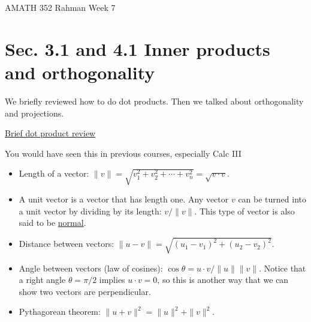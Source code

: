 \documentclass[reqno]{amsart}
\theoremstyle{definition}
\begin{document}
\begin{flushleft}
{\sc \Large AMATH 352 Rahman} \hfill Week 7
\bigskip
\end{flushleft}

\newcommand{\R}{\mathbb{R}}
\newcommand{\N}{\mathbb{N}}
\newcommand{\Z}{\mathbb{Z}}
\newcommand{\Q}{\mathbb{Q}}
\renewcommand{\CancelColor}{\color{red}}
\newcommand{\?}{\stackrel{?}{=}}
\renewcommand{\varphi}{\phi}
\newcommand{\card}{\text{Card}}
\newcommand{\bigzero}{\text{\Huge 0}}
\newcommand{\curvearrowdown}{{\color{red}\rotatebox{90}{$\curvearrowleft$}}}
\newcommand{\curvearrowup}{{\color{red}\rotatebox{90}{$\curvearrowright$}}}

\newcommand*\circled[1]{\color{red}\tikz[baseline=(char.base)]{
            \node[shape=circle,draw,inner sep=2pt] (char) {#1};}}



\section*{Sec. 3.1 and 4.1 Inner products and orthogonality}

We briefly reviewed how to do dot products.  Then we talked about orthogonality and projections.

\bigskip

\underline{Brief dot product review}

{\color{red}You would have seen this in previous courses, especially Calc III}

\begin{itemize}

\item  Length of a vector: $\|v\| = \sqrt{v_1^2 + v_2^2 + \cdots + v_n^2} = \sqrt{v\cdot v}$.
\item  A unit vector is a vector that has length one.  Any vector $v$ can be turned into a unit vector by dividing by its length: $v/\|v\|$.  This type of vector is also said to be \underline{normal}.
\item  Distance between vectors: $\|u-v\| = \sqrt{(u_1-v_1)^2 + (u_2-v_2)^2}$.
\item  Angle between vectors (law of cosines): $\cos\theta = u\cdot v/\|u\|\|v\|$.  Notice that a right angle $\theta = \pi/2$ implies $u\cdot v = 0$, so this is another way that we can show two vectors are perpendicular.
\item  Pythagorean theorem:  $\|u+v\|^2 = \|u\|^2 + \|v\|^2$.

\end{itemize}
\end{document}
